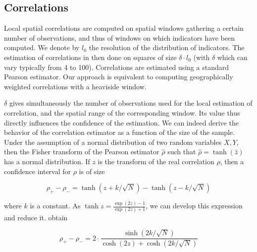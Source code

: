 \subsection{Correlations}

Local spatial correlations are computed on spatial windows gathering a certain number of observations, and thus of windows on which indicators have been computed. We denote by $l_0$ the resolution of the distribution of indicators. The estimation of correlations in then done on squares of size $\delta\cdot l_0$ (with $\delta$ which can vary typically from 4 to 100). Correlations are estimated using a standard Pearson estimator. Our approach is equivalent to computing geographically weighted correlations \citep{brunsdon2002geographically} with a heaviside window.

$\delta$ gives simultaneously the number of observations used for the local estimation of correlation, and the spatial range of the corresponding window. Its value thus directly influences the confidence of the estimation. We can indeed derive the behavior of the correlation estimator as a function of the size of the sample. Under the assumption of a normal distribution of two random variables $X,Y$, then the Fisher transform of the Pearson estimator $\hat{\rho}$ such that $\hat{\rho} = \tanh (\hat{z})$ has a normal distribution. If $z$ is the transform of the real correlation $\rho$, then a confidence interval for $\rho$ is of size

\begin{equation}
\rho_{+} - \rho_{-} = \tanh (z + k / \sqrt{N}) - \tanh (z - k / \sqrt{N})
\end{equation}

where $k$ is a constant. As $\tanh{z} = \frac{\exp (2z) - 1}{\exp (2z) + 1}$, we can develop this expression and reduce it.  obtain


\begin{equation}
	\rho_{+} - \rho_{-} = 2\cdot \frac{\sinh{(2k/\sqrt{N})}}{\cosh{(2z)} + \cosh{(2k/\sqrt{N})}}
\end{equation}


